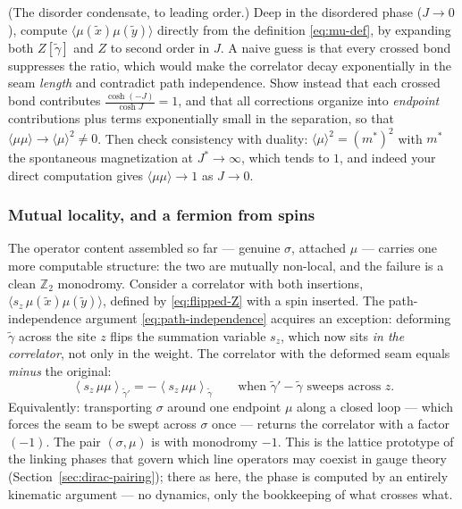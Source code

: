 \begin{exercise}[medium]
\label{exr:mu-condensate}
(The disorder condensate, to leading order.) Deep in the disordered
phase ($J \to 0$), compute $\langle\mu(\tilde x)\mu(\tilde y)\rangle$
directly from the definition \eqref{eq:mu-def}, by expanding both
$Z[\tilde\gamma]$ and $Z$ to second order in $J$. A naive guess is that
every crossed bond suppresses the ratio, which would make the correlator
decay exponentially in the seam \emph{length} and contradict path
independence. Show instead that each crossed bond contributes
$\frac{\cosh(-J)}{\cosh J} = 1$, and that all corrections organize into
\emph{endpoint} contributions plus terms exponentially small in the
separation, so that
$\langle\mu\mu\rangle \to \langle\mu\rangle^2 \neq 0$. Then check
consistency with duality: $\langle\mu\rangle^2 = (m^*)^2$ with $m^*$ the
spontaneous magnetization at $J^* \to \infty$, which tends to $1$, and
indeed your direct computation gives $\langle\mu\mu\rangle \to 1$ as $J
\to 0$.
\end{exercise}

\subsubsection{Mutual locality, and a fermion from spins}
\label{sec:mutual-locality-ising}

The operator content assembled so far --- genuine $\sigma$, attached
$\mu$ --- carries one more computable structure: the two are mutually
non-local, and the failure is a clean $\mathbb{Z}_2$ monodromy. Consider a
correlator with both insertions,
$\langle s_z\, \mu(\tilde x)\mu(\tilde y) \rangle$, defined by
\eqref{eq:flipped-Z} with a spin inserted. The path-independence
argument \eqref{eq:path-independence} acquires an exception: deforming
$\tilde\gamma$ across the site $z$ flips the summation variable $s_z$,
which now sits \emph{in the correlator}, not only in the weight. The
correlator with the deformed seam equals \emph{minus} the original:
\begin{equation}
\left\langle s_z\, \mu\mu \right\rangle_{\tilde\gamma'}
= - \left\langle s_z\, \mu\mu \right\rangle_{\tilde\gamma}
\qquad \text{when } \tilde\gamma' - \tilde\gamma \text{ sweeps across } z.
\label{eq:mutual-sign}
\end{equation}
Equivalently: transporting $\sigma$ around one endpoint $\mu$ along a
closed loop --- which forces the seam to be swept across $\sigma$ once
--- returns the correlator with a factor $(-1)$. The pair
$(\sigma, \mu)$ is  with monodromy $-1$. This
is the lattice prototype of the linking phases that govern which line
operators may coexist in gauge theory
(Section~\ref{sec:dirac-pairing}); there as here, the phase is
computed by an entirely kinematic argument --- no dynamics, only the
bookkeeping of what crosses what.

